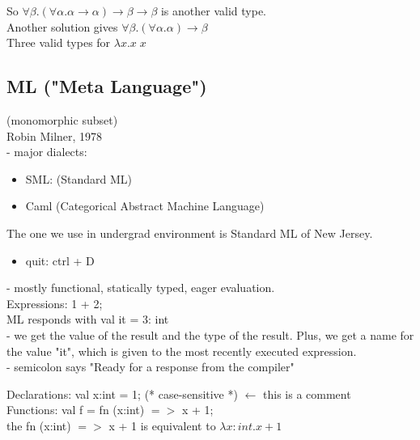 \documentclass[11pt]{article}
\begin{document}
So $\forall \beta.(\forall \alpha. \alpha \rightarrow \alpha) \rightarrow \beta \rightarrow \beta$ is another valid type. \\

Another solution gives $\forall \beta.(\forall \alpha. \alpha) \rightarrow \beta$ \\

Three valid types for $\lambda x.x\;x$  \\

\subsection{ML ("Meta Language")}

(monomorphic subset) \\

Robin Milner, 1978 \\

- major dialects:
\begin{itemize}
	\item[] SML: (Standard ML)
	\item[] Caml (Categorical Abstract Machine Language)
\end{itemize}

The one we use in undergrad environment is Standard ML of New Jersey.
\begin{itemize}
	\item[] quit: ctrl + D
\end{itemize}

- mostly functional, statically typed, eager evaluation. \\

Expressions: 1 + 2; \\

ML responds with val it = 3: int \\

- we get the value of the result and the type of the result. Plus, we get a name for the value "it", which is given to the most recently executed expression. \\

- semicolon says "Ready for a response from the compiler" 

Declarations: val x:int = 1; (* case-sensitive *)     $\leftarrow$ this is a comment \\

Functions: val f = fn (x:int) $=>$ x + 1; \\

the fn (x:int) $=>$ x + 1 is equivalent to $\lambda x:int. x+1$ \\
\end{document}
